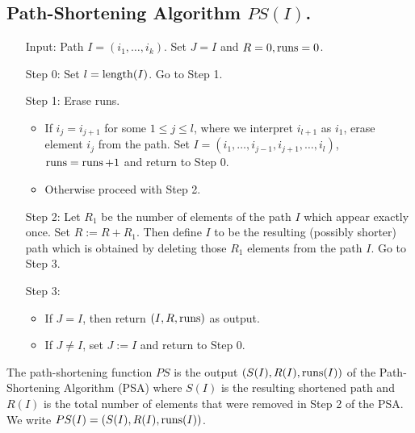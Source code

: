 \subsection*{Path-Shortening Algorithm $PS(I)$.}
\begin{itemize}
\item[Input: ] Path $I=(i_1,\ldots,i_k)$. Set $J=I$ and $R=0, \operatorname{runs} =0$. 
\item[Step 0:] Set $l= \operatorname{length}(I)$. Go to Step 1.
\item[Step 1:] Erase runs. 
\begin{itemize}
\item If $i_j=i_{j+1}$ for some $1\le j\le l$, where we interpret $i_{l+1}$ as $i_1$, erase element $i_j$ from the path. Set $I=(i_1, \ldots, i_{j-1}, i_{j+1}, \ldots, i_l)$, $\operatorname{runs} = \operatorname{runs} +1$ and return to Step 0.
\item Otherwise proceed with Step 2.
\end{itemize}
\item[Step 2:] Let $R_1$ be the number of elements of the path $I$ which appear exactly once. Set $R:=R+R_1$. Then define $I$ to be the resulting (possibly shorter) path which is obtained by deleting those $R_1$ elements from the path $I$. Go to Step 3.
\item[Step 3:] 
\begin{itemize}
\item If $J=I$, then return $(I,R,\operatorname{runs})$ as output. 
\item If $J\neq I$, set $J:=I$ and return to Step 0.
\end{itemize}
\end{itemize} 

\begin{definition}\label{def:pathshortening}
The path-shortening function $PS$ is the output  $(S(I),R(I),\operatorname{runs}(I))$ of the Path-Shortening Algorithm (PSA) 
where $S(I)$ is the resulting shortened path and $R(I)$ is the total number of 
elements that were removed in Step 2 of the PSA. We write 
$PS(I)= (S(I),R(I),\operatorname{runs}(I))$.
\end{definition}

